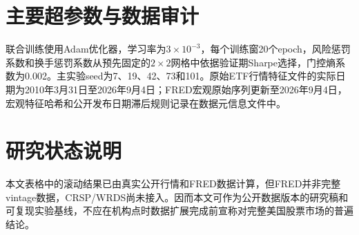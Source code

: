 \documentclass[UTF8,a4paper,zihao=-4]{ctexart}
\begin{document}
\appendix
\section{主要超参数与数据审计}
联合训练使用Adam优化器，学习率为$3\times10^{-3}$，每个训练窗20个epoch，风险惩罚系数和换手惩罚系数从预先固定的$2\times2$网格中依据验证期Sharpe选择，门控熵系数为0.002。主实验seed为7、19、42、73和101。原始ETF行情特征文件的实际日期为2010年3月31日至2026年9月4日；FRED宏观原始序列更新至2026年9月4日，宏观特征哈希和公开发布日期滞后规则记录在数据元信息文件中。

\section{研究状态说明}
本文表格中的滚动结果已由真实公开行情和FRED数据计算，但FRED并非完整vintage数据，CRSP/WRDS尚未接入。因而本文可作为公开数据版本的研究稿和可复现实验基线，不应在机构点时数据扩展完成前宣称对完整美国股票市场的普遍结论。
\end{document}
